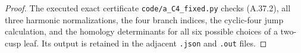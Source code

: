 \begin{proof}
The executed exact certificate \texttt{code/a\_C4\_fixed.py}
checks (A.37.2), all three harmonic normalizations,
the four branch indices, the cyclic-four jump calculation,
and the homology determinants for all six possible
choices of a two-cusp leaf. Its output is retained
in the adjacent \texttt{.json} and \texttt{.out} files.
\end{proof}
